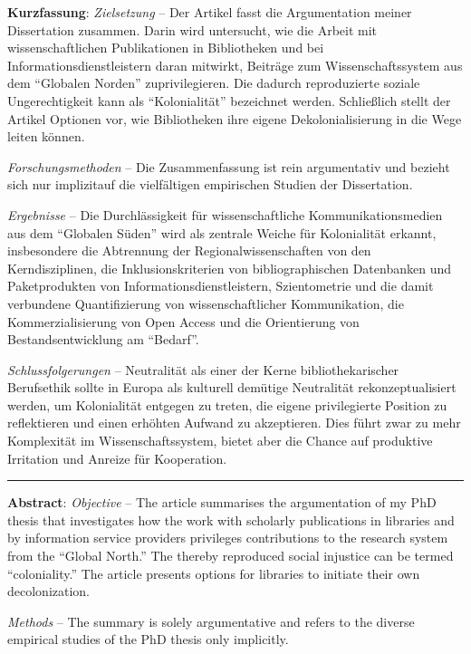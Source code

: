 \textbf{Kurzfassung}: \textit{Zielsetzung} -- Der Artikel fasst die Argumentation
meiner Dissertation zusammen. Darin wird untersucht, wie die Arbeit mit
wissenschaftlichen Publikationen in Bibliotheken und bei
Informationsdienstleistern daran mitwirkt, Beiträge zum
Wissenschaftssystem aus dem \enquote{Globalen Norden} zuprivilegieren. Die
dadurch reproduzierte soziale Ungerechtigkeit kann als \enquote{Kolonialität}
bezeichnet werden. Schließlich stellt der Artikel Optionen vor, wie
Bibliotheken ihre eigene Dekolonialisierung in die Wege leiten können.

\textit{Forschungsmethoden} -- Die Zusammenfassung ist rein argumentativ und
bezieht sich nur implizitauf die vielfältigen empirischen Studien der
Dissertation.

\textit{Ergebnisse} -- Die Durchlässigkeit für wissenschaftliche
Kommunikationsmedien aus dem \enquote{Globalen Süden} wird als zentrale Weiche
für Kolonialität erkannt, insbesondere die Abtrennung der
Regionalwissenschaften von den Kerndisziplinen, die Inklusionskriterien
von bibliographischen Datenbanken und Paketprodukten von
Informationsdienstleistern, Szientometrie und die damit verbundene
Quantifizierung von wissenschaftlicher Kommunikation, die
Kommerzialisierung von Open Access und die Orientierung von
Bestandsentwicklung am \enquote{Bedarf}.

\textit{Schlussfolgerungen} -- Neutralität als einer der Kerne bibliothekarischer
Berufsethik sollte in Europa als kulturell demütige Neutralität
rekonzeptualisiert werden, um Kolonialität entgegen zu treten, die
eigene privilegierte Position zu reflektieren und einen erhöhten Aufwand
zu akzeptieren. Dies führt zwar zu mehr Komplexität im
Wissenschaftssystem, bietet aber die Chance auf produktive Irritation
und Anreize für Kooperation.

\begin{center}\rule{0.5\linewidth}{0.5pt}\end{center}

\textbf{Abstract}: \textit{Objective} -- The article summarises the argumentation
of my PhD thesis that investigates how the work with scholarly
publications in libraries and by information service providers
privileges contributions to the research system from the \enquote{Global
North.} The thereby reproduced social injustice can be termed
\enquote{coloniality.} The article presents options for libraries to initiate
their own decolonization.

\textit{Methods} -- The summary is solely argumentative and refers to the diverse
empirical studies of the PhD thesis only implicitly.

